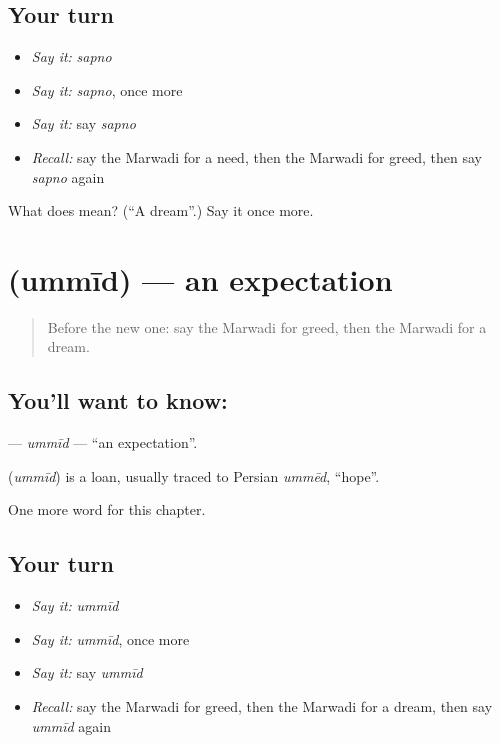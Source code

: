 \subsection*{Your turn}
\begin{itemize}
\raggedright
  \item \emph{Say it:} \emph{sapno}
  \item \emph{Say it:} \emph{sapno}, once more
  \item \emph{Say it:} say \emph{sapno}
  \item \emph{Recall:} say the Marwadi for a need, then the Marwadi for greed, then say \emph{sapno} again
\end{itemize}

\begin{tcolorbox}[breakable,colback=teal!4,colframe=teal!35!black,title={Before you move on}]
What does  mean? (\textquotedblleft{}A dream\textquotedblright{}.) Say it once more.
\end{tcolorbox}
\section[\texorpdfstring{\mw{उम्मीद} (ummīd)}{उम्मीद (ummīd)}]{ (ummīd) — an expectation}

\label{lesson:MW-C112-ummid}



\begin{quote}
Before the new one: say the Marwadi for greed, then the Marwadi for a dream.
\end{quote}

\subsection*{You'll want to know: }
\textbf{} — \emph{ummīd} — \textquotedblleft{}an expectation\textquotedblright{}.

\begin{cousinweb}
\textbf{} (\emph{ummīd}) is a loan, usually traced to Persian \emph{ummēd}, \textquotedblleft{}hope\textquotedblright{}.
\end{cousinweb}

\begin{grammarlens}[title={What you've built}]
One more word for this chapter.
\end{grammarlens}

\subsection*{Your turn}
\begin{itemize}
\raggedright
  \item \emph{Say it:} \emph{ummīd}
  \item \emph{Say it:} \emph{ummīd}, once more
  \item \emph{Say it:} say \emph{ummīd}
  \item \emph{Recall:} say the Marwadi for greed, then the Marwadi for a dream, then say \emph{ummīd} again
\end{itemize}

